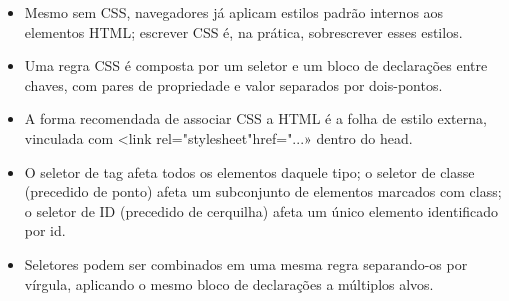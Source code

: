 \begin{itemize}
  \item Mesmo sem CSS, navegadores já aplicam estilos padrão internos aos elementos HTML; escrever CSS é, na prática, sobrescrever esses estilos.
\end{itemize}

\begin{itemize}
  \item Uma regra CSS é composta por um seletor e um bloco de declarações entre chaves, com pares de propriedade e valor separados por dois-pontos.
\end{itemize}

\begin{itemize}
  \item A forma recomendada de associar CSS a HTML é a folha de estilo externa, vinculada com <link rel="stylesheet"href="...» dentro do head.
\end{itemize}

\begin{itemize}
  \item O seletor de tag afeta todos os elementos daquele tipo; o seletor de classe (precedido de ponto) afeta um subconjunto de elementos marcados com class; o seletor de ID (precedido de cerquilha) afeta um único elemento identificado por id.
\end{itemize}

\begin{itemize}
  \item Seletores podem ser combinados em uma mesma regra separando-os por vírgula, aplicando o mesmo bloco de declarações a múltiplos alvos.
\end{itemize}
